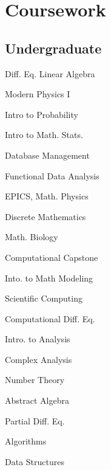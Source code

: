 \documentclass[]{deedy-resume-openfont}
\begin{document}
\begin{minipage}[t]{0.55\textwidth}


\section{Coursework}
\subsection{Undergraduate}
\begin{minipage}[t]{0.45\textwidth} 
\vspace{\topsep} %
\begin{tightemize}
\item Diff. Eq. Linear Algebra
\item Modern Physics I
\item Intro to Probability
\item Intro to Math. Stats.
\item Database Management
\item Functional Data Analysis
\item EPICS, Math. Physics
\item Discrete Mathematics
\item Math. Biology
\item Computational Capstone
\end{tightemize}
\end{minipage}
\begin{minipage}[t]{0.45\textwidth}
\vspace{\topsep} %
\begin{tightemize}
\item Into. to Math Modeling
\item Scientific Computing
\item Computational Diff. Eq.
\item Intro. to Analysis
\item Complex Analysis
\item Number Theory
\item Abstract Algebra
\item Partial Diff. Eq.
\item Algorithms
\item Data Structures
\end{tightemize}
\end{minipage}
\sectionsep



\end{minipage}
\end{document}

